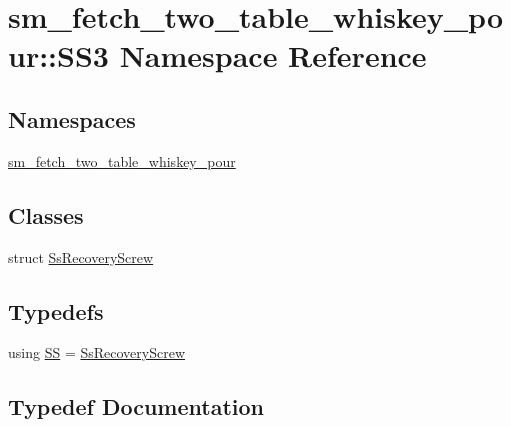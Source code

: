 \hypertarget{namespacesm__fetch__two__table__whiskey__pour_1_1SS3}{}\section{sm\+\_\+fetch\+\_\+two\+\_\+table\+\_\+whiskey\+\_\+pour\+:\+:S\+S3 Namespace Reference}
\label{namespacesm__fetch__two__table__whiskey__pour_1_1SS3}
\subsection*{Namespaces}
\begin{DoxyCompactItemize}
\item 
 \hyperlink{namespacesm__fetch__two__table__whiskey__pour_1_1SS3_1_1sm__fetch__two__table__whiskey__pour}{sm\+\_\+fetch\+\_\+two\+\_\+table\+\_\+whiskey\+\_\+pour}
\end{DoxyCompactItemize}
\subsection*{Classes}
\begin{DoxyCompactItemize}
\item 
struct \hyperlink{structsm__fetch__two__table__whiskey__pour_1_1SS3_1_1SsRecoveryScrew}{Ss\+Recovery\+Screw}
\end{DoxyCompactItemize}
\subsection*{Typedefs}
\begin{DoxyCompactItemize}
\item 
using \hyperlink{namespacesm__fetch__two__table__whiskey__pour_1_1SS3_a6b878b9bd27c9d0c7b640da7bfd2cd88}{SS} = \hyperlink{structsm__fetch__two__table__whiskey__pour_1_1SS3_1_1SsRecoveryScrew}{Ss\+Recovery\+Screw}
\end{DoxyCompactItemize}


\subsection{Typedef Documentation}
\mbox{\label{namespacesm__fetch__two__table__whiskey__pour_1_1SS3_a6b878b9bd27c9d0c7b640da7bfd2cd88}} 
